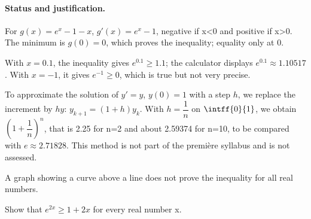 \paragraph{Status and justification.} For $g(x)=e^x-1-x$, $g\prime(x)=e^x-1$, negative if x<0 and positive if x>0. The minimum is $g(0)=0$, which proves the inequality; equality only at 0.
\begin{example}With $x=\num{0,1}$, the inequality gives $e^{\num{0,1}}\geq\num{1,1}$; the calculator displays $e^{\num{0,1}}\approx\num{1,10517}$. With $x=-1$, it gives $e^{-1}\geq0$, which is true but not very precise.\end{example}\label{C09-EX5}
\begin{beyond}To approximate the solution of $y\prime=y$, $y(0)=1$ with a step $h$, we replace the increment by $hy$: $y_{k+1}=(1+h)y_k$. With $h=\dfrac1n$ on $\intff{0}{1}$, we obtain $\left(1+\dfrac1n\right)^n$, that is \num{2,25} for n=2 and about \num{2,59374} for n=10, to be compared with $e\approx\num{2,71828}$. This method is not part of the première syllabus and is not assessed.\end{beyond}
\begin{pitfall}A graph showing a curve above a line does not prove the inequality for all real numbers.\end{pitfall}
\begin{application}Show that $e^{2x}\geq1+2x$ for every real number x.\end{application}\label{C09-AP5}
\mxnewpage
